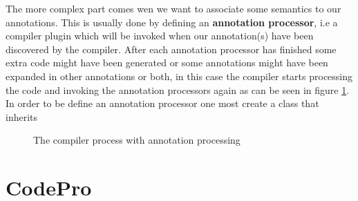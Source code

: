 	The more complex part comes wen we want to associate some semantics to our
annotations. This is usually done by defining an \textbf{annotation
processor}, i.e a compiler plugin which will be invoked when our annotation(s) have been
discovered by the compiler. After each annotation processor has finished some
extra code might have been generated or some annotations might have been
expanded in other annotations or both, in this case the compiler starts
processing the code and invoking the annotation processors again as can be
seen in figure \ref{fig:annProc}.
	 In order to be define an annotation processor one most create a class that
inherits  
	
	
	
		
	
\begin{figure}
\centering
{}
\caption{The compiler process with annotation processing\label{fig:annProc}}
\end{figure}
		

\section{CodePro}



